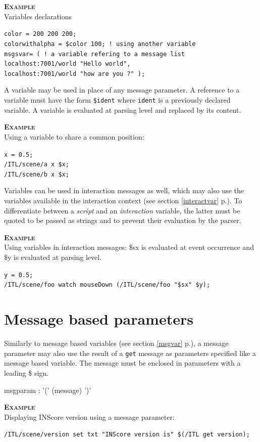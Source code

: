 \documentclass[a4paper,twoside]{report}
\newcommand{\sublevel}[1]	{\section{#1}}
\newcommand{\fullref}[1]	{\ref{#1} p.\pageref{#1}}
\newcommand{\OSC}[1]		{\texttt{#1}}
\newcommand{\example}		{\textbf{\hspace{-1.5cm}\textbf{\textsc{Example }}}}
\newcommand{\sample}	[1]			{\vspace{-2mm}\begin{center}\colorbox{mygrey}{
								\begin{minipage}[t]{0.9\columnwidth} 
								{\small \texttt{#1}}
								\end{minipage}}\end{center}}
\begin{document}
\example \\
Variables declarations
\sample{color = 200 200 200; \\
colorwithalpha = \$color 100; ! using another variable \\
msgsvar= ( \hspace*{2.7cm}  ! a variable refering to a message list \\
\hspace*{1cm} localhost:7001/world "Hello world", \\
\hspace*{1cm} localhost:7001/world "how are you ?" );
}


A variable may be used in place of any message parameter. A reference to a variable must have the form \OSC{\$ident} where \OSC{ident} is a previously declared variable. A variable is evaluated at parsing level and replaced by its content.

\example \\
Using a variable to share a common position:
\sample{x = 0.5;\\
/ITL/scene/a x \$x;\\
/ITL/scene/b x \$x;
}

Variables can be used in interaction messages as well, which may also use the variables available in the interaction context (see section \fullref{interactvar}). To differentiate between a \emph{script} and an \emph{interaction} variable, the latter must be quoted to be passed as strings and to prevent their evaluation by the parser. 

\example \\
Using variables in interaction messages: \$sx is evaluated at event occurrence	and \$y is evaluated at parsing level.
\sample{y = 0.5;\\
/ITL/scene/foo watch mouseDown (/ITL/scene/foo "\$sx" \$y);
}


\sublevel{Message based parameters}\label{scriptmsgparam}

Similarly to message based variables (see section \fullref{msgvar}), a message parameter may also use the result of a \OSC{get} message as parameters specified like a message based variable.
The message must be enclosed in parameters with a leading \$ sign.
\begin{rail} 
msgparam : '(' (message) ')'
\end{rail}

\example \\
Displaying INScore version using a message parameter:
\sample{/ITL/scene/version set  txt "INScore version is" \$(/ITL get version);}
\end{document}
